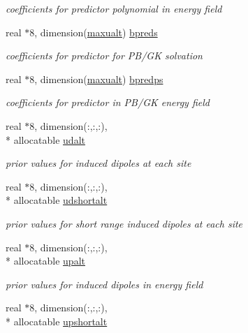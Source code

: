 \begin{DoxyCompactItemize}
\begin{DoxyCompactList}\small\item\em coefficients for predictor polynomial in energy field \end{DoxyCompactList}\item 
real $\ast$8, dimension(\hyperlink{classuprior_a5d9038d2473c8075c0636977eafb4d57}{maxualt}) \hyperlink{classuprior_aa5e518724a69cbdc67f466c84a0f6035}{bpreds}
\begin{DoxyCompactList}\small\item\em coefficients for predictor for P\-B/\-G\-K solvation \end{DoxyCompactList}\item 
real $\ast$8, dimension(\hyperlink{classuprior_a5d9038d2473c8075c0636977eafb4d57}{maxualt}) \hyperlink{classuprior_a324305285c84b20f97d84c2b5d11da11}{bpredps}
\begin{DoxyCompactList}\small\item\em coefficients for predictor in P\-B/\-G\-K energy field \end{DoxyCompactList}\item 
real $\ast$8, dimension(\-:,\-:,\-:), \\*
allocatable \hyperlink{classuprior_ab7223a6643ed089c1e8126acc4a1dc80}{udalt}
\begin{DoxyCompactList}\small\item\em prior values for induced dipoles at each site \end{DoxyCompactList}\item 
real $\ast$8, dimension(\-:,\-:,\-:), \\*
allocatable \hyperlink{classuprior_a63f7d61fa4654ee2cd7460514deb2040}{udshortalt}
\begin{DoxyCompactList}\small\item\em prior values for short range induced dipoles at each site \end{DoxyCompactList}\item 
real $\ast$8, dimension(\-:,\-:,\-:), \\*
allocatable \hyperlink{classuprior_ae50156ff52a0b156355471f9935a3e21}{upalt}
\begin{DoxyCompactList}\small\item\em prior values for induced dipoles in energy field \end{DoxyCompactList}\item 
real $\ast$8, dimension(\-:,\-:,\-:), \\*
allocatable \hyperlink{classuprior_ab1763d53b72fde72ed327e0f3f639f7a}{upshortalt}

\end{DoxyCompactItemize}
